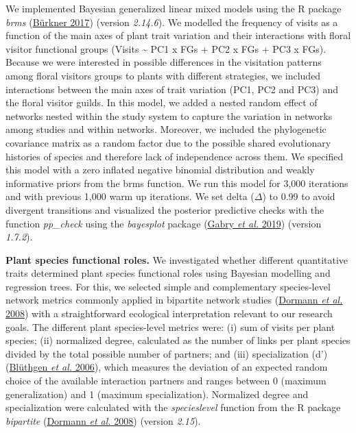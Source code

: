 \documentclass[
  12pt,
  a4paper,
]{article}
\begin{document}
We implemented Bayesian generalized linear mixed models using the R package \emph{brms} (\protect\hyperlink{ref-burkner2017}{Bürkner 2017}) (version \emph{2.14.6}). We modelled the frequency of visits as a function of the main axes of plant trait variation and their interactions with floral visitor functional groups (Visits \textasciitilde{} PC1 x FGs + PC2 x FGs + PC3 x FGs). Because we were interested in possible differences in the visitation patterns among floral visitors groups to plants with different strategies, we included interactions between the main axes of trait variation (PC1, PC2 and PC3) and the floral visitor guilds. In this model, we added a nested random effect of networks nested within the study system to capture the variation in networks among studies and within networks. Moreover, we included the phylogenetic covariance matrix as a random factor due to the possible shared evolutionary histories of species and therefore lack of independence across them. We specified this model with a zero inflated negative binomial distribution and weakly informative priors from the brms function. We run this model for 3,000 iterations and with previous 1,000 warm up iterations. We set delta (\(\Delta\)) to 0.99 to avoid divergent transitions and visualized the posterior predictive checks with the function \emph{pp\_check} using the \emph{bayesplot} package (\protect\hyperlink{ref-gabry2019}{Gabry \emph{et al.} 2019}) (version \emph{1.7.2}).

\textbf{Plant species functional roles.} We investigated whether different quantitative traits determined plant species functional roles using Bayesian modelling and regression trees. For this, we selected simple and complementary species-level network metrics commonly applied in bipartite network studies (\protect\hyperlink{ref-dormann2008}{Dormann \emph{et al.} 2008}) with a straightforward ecological interpretation relevant to our research goals. The different plant species-level metrics were: (i) sum of visits per plant species; (ii) normalized degree, calculated as the number of links per plant species divided by the total possible number of partners; and (iii) specialization (d') (\protect\hyperlink{ref-bluthgen2006}{Blüthgen \emph{et al.} 2006}), which measures the deviation of an expected random choice of the available interaction partners and ranges between 0 (maximum generalization) and 1 (maximum specialization). Normalized degree and specialization were calculated with the \emph{specieslevel} function from the R package \emph{bipartite} (\protect\hyperlink{ref-dormann2008}{Dormann \emph{et al.} 2008}) (version \emph{2.15}).
\end{document}
